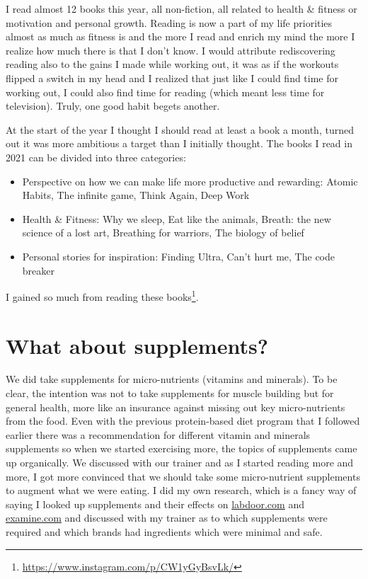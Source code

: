 \documentclass[
  oneside]{book}
\DeclareRobustCommand{\href}[2]{#2\footnote{\url{#1}}}
\begin{document}
I read almost 12 books this year, all non-fiction, all related to health \& fitness or motivation and personal growth. Reading is now a part of my life priorities almost as much as fitness is and the more I read and enrich my mind the more I realize how much there is that I don't know. I would attribute rediscovering reading also to the gains I made while working out, it was as if the workouts flipped a switch in my head and I realized that just like I could find time for working out, I could also find time for reading (which meant less time for television). Truly, one good habit begets another.

At the start of the year I thought I should read at least a book a month, turned out it was more ambitious a target than I initially thought. The books I read in 2021 can be divided into three categories:

\begin{itemize}
\item
  Perspective on how we can make life more productive and rewarding: Atomic Habits, The infinite game, Think Again, Deep Work
\item
  Health \& Fitness: Why we sleep, Eat like the animals, Breath: the new science of a lost art, Breathing for warriors, The biology of belief
\item
  Personal stories for inspiration: Finding Ultra, Can't hurt me, The code breaker
\end{itemize}

I gained so much from reading \href{https://www.instagram.com/p/CW1yGyBsvLk/}{these books}.

\hypertarget{what-about-supplements}{%
\section{What about supplements?}\label{what-about-supplements}}

We did take supplements for micro-nutrients (vitamins and minerals). To be clear, the intention was not to take supplements for muscle building but for general health, more like an insurance against missing out key micro-nutrients from the food. Even with the previous protein-based diet program that I followed earlier there was a recommendation for different vitamin and minerals supplements so when we started exercising more, the topics of supplements came up organically. We discussed with our trainer and as I started reading more and more, I got more convinced that we should take some micro-nutrient supplements to augment what we were eating. I did my own research, which is a fancy way of saying I looked up supplements and their effects on \url{labdoor.com} and \url{examine.com} and discussed with my trainer as to which supplements were required and which brands had ingredients which were minimal and safe.
\end{document}

